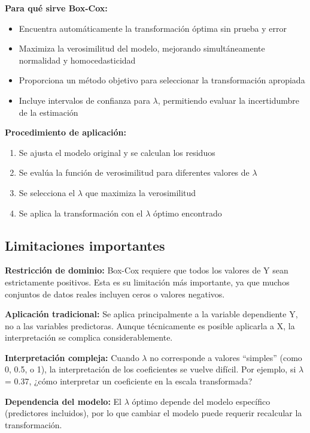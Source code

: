 \documentclass[
  letterpaper,
  DIV=11,
  numbers=noendperiod]{scrreprt}
\providecommand{\tightlist}{%
  \setlength{\itemsep}{0pt}\setlength{\parskip}{0pt}}
\begin{document}
\textbf{Para qué sirve Box-Cox:}

\begin{itemize}
\tightlist
\item
  Encuentra automáticamente la transformación óptima sin prueba y error
\item
  Maximiza la verosimilitud del modelo, mejorando simultáneamente
  normalidad y homocedasticidad
\item
  Proporciona un método objetivo para seleccionar la transformación
  apropiada
\item
  Incluye intervalos de confianza para \(\lambda\), permitiendo evaluar
  la incertidumbre de la estimación
\end{itemize}

\textbf{Procedimiento de aplicación:}

\begin{enumerate}
\def\labelenumi{\arabic{enumi}.}
\tightlist
\item
  Se ajusta el modelo original y se calculan los residuos
\item
  Se evalúa la función de verosimilitud para diferentes valores de
  \(\lambda\)
\item
  Se selecciona el \(\lambda\) que maximiza la verosimilitud
\item
  Se aplica la transformación con el \(\lambda\) óptimo encontrado
\end{enumerate}

\subsection{Limitaciones importantes}\label{limitaciones-importantes}

\textbf{Restricción de dominio:} Box-Cox requiere que todos los valores
de Y sean estrictamente positivos. Esta es su limitación más importante,
ya que muchos conjuntos de datos reales incluyen ceros o valores
negativos.

\textbf{Aplicación tradicional:} Se aplica principalmente a la variable
dependiente Y, no a las variables predictoras. Aunque técnicamente es
posible aplicarla a X, la interpretación se complica considerablemente.

\textbf{Interpretación compleja:} Cuando \(\lambda\) no corresponde a
valores ``simples'' (como 0, 0.5, o 1), la interpretación de los
coeficientes se vuelve difícil. Por ejemplo, si \(\lambda\) = 0.37,
¿cómo interpretar un coeficiente en la escala transformada?

\textbf{Dependencia del modelo:} El \(\lambda\) óptimo depende del
modelo específico (predictores incluidos), por lo que cambiar el modelo
puede requerir recalcular la transformación.
\end{document}
